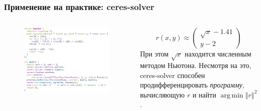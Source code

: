 \documentclass[notheorems,aspectratio=169]{beamer}
\DeclareMathOperator*{\argmin}{arg\,min}
\begin{document}
\begin{frame}
  \frametitle{Применение на практике: ceres-solver}

  \begin{columns}[c]
    \begin{column}{0.6\textwidth}
      \begin{figure}
        \includegraphics[width=0.8\linewidth, height=0.8\textheight, keepaspectratio]{minprog.png}\hspace*{4cm}
      \end{figure}
    \end{column}

    \begin{column}{0.4\textwidth}
      \begin{equation*}
        r\left(x, y\right)\approx
        \begin{pmatrix}
          \sqrt{x}-1.41 \\
          y-2
        \end{pmatrix}
      \end{equation*}
      При этом $\sqrt{x}$ находится численным методом Ньютона. Несмотря на это, ceres-solver способен продифференцировать \emph{программу}, вычисляющую $r$ и найти $\argmin\left\Vert r\right\Vert^2$.
    \end{column}
  \end{columns}

\end{frame}
\end{document}
